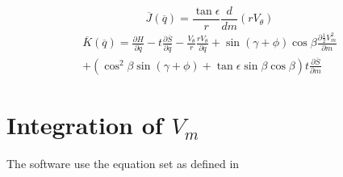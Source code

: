 \documentclass{report}
\begin{document}
        \begin{equation}
            \overline{J} \left(\overline{q}\right) = \frac{\tan \epsilon}{r} \frac{d}{dm}\left(rV_{\theta}\right)
        \end{equation}
        \begin{equation}
            \begin{multlined}
                \overline{K} \left(\overline{q}\right) = \frac{\partial H}{\partial \overline{q}} - t \frac{\partial \overline{S}}{\partial \overline{q}} - \frac{V_{\theta}}{r} \frac{rV_{\theta}}{\partial \overline{q}} + 
                \sin \left(\gamma + \phi\right) \cos \beta \frac{\partial \frac{1}{2}V_m^2}{\partial m} \\
                + \left(\cos^2 \beta \sin \left(\gamma + \phi \right) +  \tan \epsilon \sin \beta \cos \beta \right) t \frac{\partial \overline{S}}{\partial m}
            \end{multlined}
        \end{equation}
    \chapter{Integration of \(V_m\)}
    
    The software use the equation set as defined in \cite{Novak77}
    
    
\end{document}
